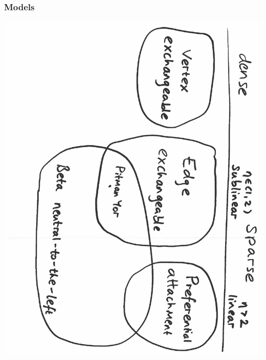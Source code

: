 \documentclass[final,hyperref={pdfpagelabels=false},noamsthm]{beamer}
\begin{document}
\begin{frame}
	\frametitle{Models}
	\includegraphics[angle=90,origin=c,scale=0.4]{fig/models7}
\end{frame}
\end{document}
